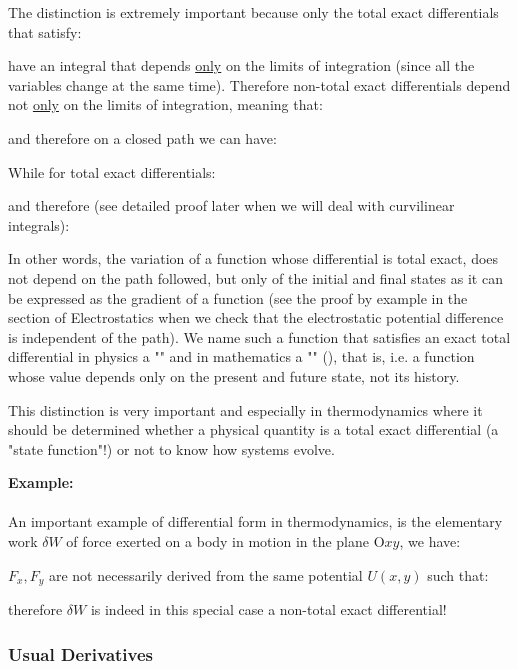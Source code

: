 	The distinction is extremely important because only the total exact differentials that satisfy:
	
	have an integral that depends \underline{only} on the limits of integration (since all the variables change at the same time). Therefore non-total exact differentials depend not \underline{only} on the limits of integration, meaning that:
	
	and therefore on a closed path we can have:
	
	While for total exact differentials:
	
	and therefore (see detailed proof later when we will deal with curvilinear integrals):
	
	In other words, the variation of a function whose differential is total exact, does not depend on the path followed, but only of the initial and final states as it can be expressed as the gradient of a function (see the proof by example in the section of Electrostatics when we check that the electrostatic potential difference is independent of the path). We name such a function that satisfies an exact total differential in physics a "" and in mathematics a "" (), that is, i.e. a function whose value depends only on the present and future state, not its history.
	
	This distinction is very important and especially in thermodynamics where it should be determined whether a physical quantity is a total exact differential (a "state function"!) or not to know how systems evolve.
	
	\begin{tcolorbox}[colframe=black,colback=white,sharp corners]
\textbf{{\Large {}}Example:}\\\\
An important example of differential form in thermodynamics, is the elementary work $\delta W$ of  force exerted on a body in motion in the plane $\text{O}xy$, we have:
	
	$F_x,F_y$ are not necessarily derived from the same potential $U(x, y)$ such that:
	
	therefore  $\delta W$ is indeed in this special case a non-total exact differential!
	\end{tcolorbox}
	 
	 \subsubsection{Usual Derivatives}\label{usual derivatives}
	 
